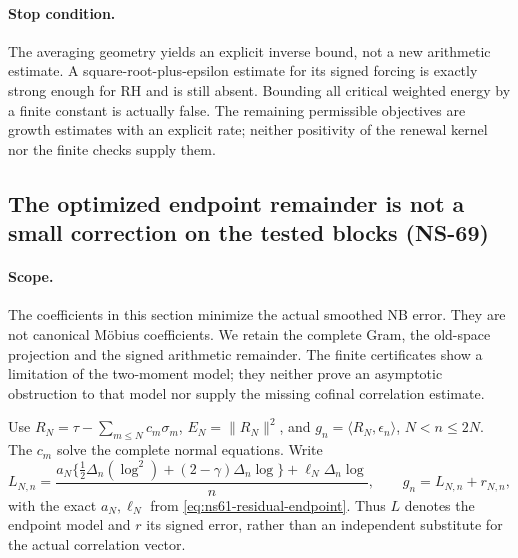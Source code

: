 \documentclass[11pt]{article}
\theoremstyle{remark}
\begin{document}
\paragraph{Stop condition.}
The averaging geometry yields an explicit inverse bound, not a new
arithmetic estimate. A square-root-plus-epsilon estimate for its signed
forcing is exactly strong enough for RH and is still absent. Bounding
all critical weighted energy by a finite constant is actually false.
The remaining permissible objectives are growth estimates with an
explicit rate; neither positivity of the renewal kernel nor the finite
checks supply them.

\subsection{The optimized endpoint remainder is not a small correction on the tested blocks (NS-69)}
\label{sec:ns69-actual-remainder}

\paragraph{Scope.}
The coefficients in this section minimize the actual smoothed NB error.
They are not canonical M\"obius coefficients. We retain the complete
Gram, the old-space projection and the signed arithmetic remainder.
The finite certificates show a limitation of the two-moment model;
they neither prove an asymptotic obstruction to that model nor supply
the missing cofinal correlation estimate.

Use $R_N=\tau-\sum_{m\leq N}c_m\sigma_m$, $E_N=\|R_N\|^2$,
and $g_n=\langle R_N,\epsilon_n\rangle$, $N<n\leq2N$.
The $c_m$ solve the complete normal equations. Write
\[
 L_{N,n}=\frac{a_N\{\tfrac12\Delta_n(\log^2)
                  +(2-\gamma)\Delta_n\log\}
                   +\ell_N\Delta_n\log}{n},
 \qquad g_n=L_{N,n}+r_{N,n},
\]
with the exact $a_N,\ell_N$ from
\eqref{eq:ns61-residual-endpoint}. Thus $L$ denotes the endpoint
model and $r$ its signed error, rather than an independent substitute
for the actual correlation vector.
\end{document}
